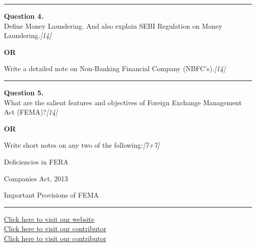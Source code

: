 \documentclass[11pt,a4paper]{article}
\newcommand{\pts}[1]{\hfill   \textit{[#1]}}
\begin{document}
\medskip\rule{\linewidth}{0.2pt}




\noindent   \textbf{Question 4.} \\
Define Money Laundering. And also explain SEBI Regulation on Money Laundering.\pts{14}

\centerline{   \textbf{OR}}

Write a detailed note on Non-Banking Financial Company (NBFC's).\pts{14}

\medskip\rule{\linewidth}{0.2pt}




\noindent   \textbf{Question 5.} \\
What are the salient features and objectives of Foreign Exchange Management Act (FEMA)?\pts{14}

\centerline{   \textbf{OR}}

Write short notes on any two of the following:\pts{7+7}

\begin{parts}
  \item Deficiencies in FERA
  \item Companies Act, 2013
  \item Important Provisions of FEMA
\end{parts}

\vfill
\rule{\linewidth}{0.4pt}

\begin{center}\small
  \href{https://bhu-exam.vercel.app/}{Click here to visit our website}\\[4pt]
  \href{https://me-aryan.vercel.app/}{Click here to visit our contributor}\\[4pt]
  \href{https://quashan-me.vercel.app/}{Click here to visit our contributor}
\end{center}
\end{document}
